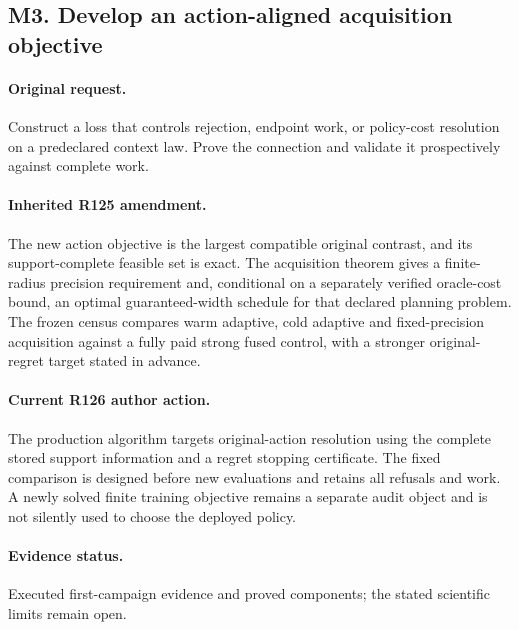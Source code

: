 \subsection*{M3. Develop an action-aligned acquisition objective}
\paragraph{Original request.} Construct a loss that controls rejection, endpoint work, or policy-cost resolution on a predeclared context law. Prove the connection and validate it prospectively against complete work.

\paragraph{Inherited R125 amendment.} The new action objective is the largest compatible original contrast, and its support-complete feasible set is exact. The acquisition theorem gives a finite-radius precision requirement and, conditional on a separately verified oracle-cost bound, an optimal guaranteed-width schedule for that declared planning problem. The frozen census compares warm adaptive, cold adaptive and fixed-precision acquisition against a fully paid strong fused control, with a stronger original-regret target stated in advance.

\paragraph{Current R126 author action.} The production algorithm targets original-action resolution using the complete stored support information and a regret stopping certificate. The fixed comparison is designed before new evaluations and retains all refusals and work. A newly solved finite training objective remains a separate audit object and is not silently used to choose the deployed policy.

\paragraph{Evidence status.} Executed first-campaign evidence and proved components; the stated scientific limits remain open.

